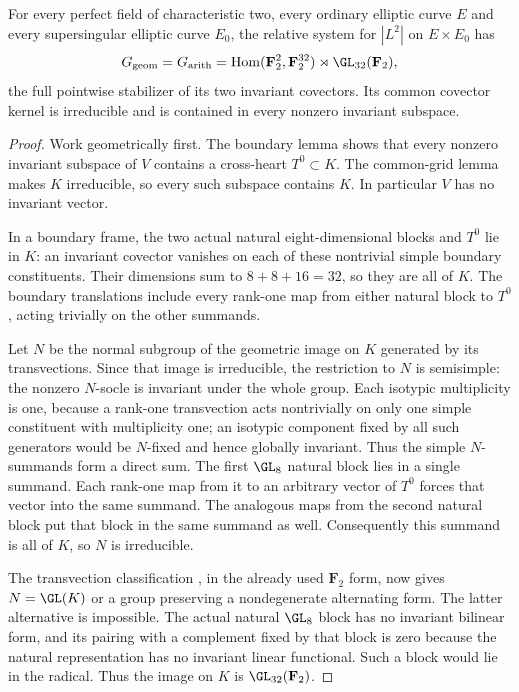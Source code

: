 \begin{theorem}
\label{thm:mixed-every-fixed-modulus-degree-two-candidate}
For every perfect field of characteristic two, every ordinary
elliptic curve $E$ and every supersingular elliptic curve $E_0$,
the relative system for $|L^2|$ on $E\times E_0$ has
\[
 G_{\mathrm{geom}}=G_{\mathrm{arith}}
   =\operatorname{Hom}(\mathbf F_2^2,\mathbf F_2^{32})
                         \rtimes\GL_{32}(\mathbf F_2),
\]
the full pointwise stabilizer of its two invariant covectors.
Its common covector kernel is irreducible and is contained
in every nonzero invariant subspace.
\end{theorem}
\begin{proof}
Work geometrically first. The boundary lemma shows that every
nonzero invariant subspace of $V$ contains a cross-heart
$T^0\subset K$. The common-grid lemma makes $K$ irreducible,
so every such subspace contains $K$. In particular $V$ has
no invariant vector.

In a boundary frame, the two actual natural eight-dimensional
blocks and $T^0$ lie in $K$: an invariant covector vanishes
on each of these nontrivial simple boundary constituents.
Their dimensions sum to $8+8+16=32$, so they are all of $K$.
The boundary translations include every rank-one map from
either natural block to $T^0$, acting trivially on the other
summands.

Let $N$ be the normal subgroup of the geometric image on $K$
generated by its transvections. Since that image is irreducible,
the restriction to $N$ is semisimple: the nonzero $N$-socle
is invariant under the whole group. Each isotypic multiplicity
is one, because a rank-one transvection acts nontrivially on
only one simple constituent with multiplicity one; an
isotypic component fixed by all such generators would be
$N$-fixed and hence globally invariant. Thus the simple
$N$-summands form a direct sum. The first $\GL_8$ natural
block lies in a single summand. Each rank-one map from it
to an arbitrary vector of $T^0$ forces that vector into
the same summand. The analogous maps from the second
natural block put that block in the same summand as well.
Consequently this summand is all of $K$, so $N$ is irreducible.

The transvection classification
\cite[Theorem~3.6, printed p.~22]{KantorSeress2001}, in the
already used $\mathbf F_2$ form, now gives $N=\GL(K)$ or
a group preserving a nondegenerate alternating form.
The latter alternative is impossible. The actual natural
$\GL_8$ block has no invariant bilinear form, and its
pairing with a complement fixed by that block is zero
because the natural representation has no invariant
linear functional. Such a block would lie in the radical.
Thus the image on $K$ is $\GL_{32}(\mathbf F_2)$.


\end{proof}
